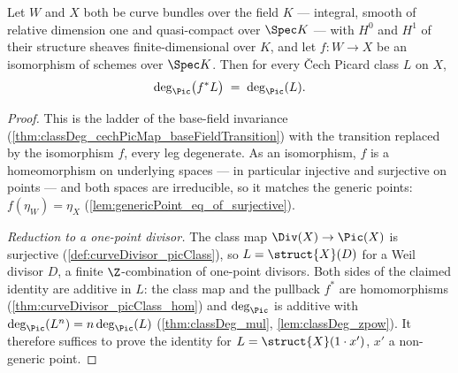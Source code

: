 \begin{theorem}
  \label{thm:classDeg_cechPicMap_of_isIso}
  \leanok
  Let \(W\) and \(X\) both be curve bundles over the field \(K\) --- integral, smooth
  of relative dimension one and quasi-compact over \(\Spec K\) --- with \(H^0\) and
  \(H^1\) of their structure sheaves finite-dimensional over \(K\), and let
  \(f : W \to X\) be an isomorphism of schemes over \(\Spec K\). Then for every \v Cech
  Picard class \(L\) on \(X\),
  \[
    \deg_{\Pic}\bigl(f^{*}L\bigr) \;=\; \deg_{\Pic}(L).
  \]
\end{theorem}
\begin{proof}
  \leanok
  This is the ladder of the base-field invariance
  (\ref{thm:classDeg_cechPicMap_baseFieldTransition}) with the transition replaced by
  the isomorphism \(f\), every leg degenerate. As an isomorphism, \(f\) is a
  homeomorphism on underlying spaces --- in particular injective and surjective on
  points --- and both spaces are irreducible, so it matches the generic points:
  \(f(\eta_W) = \eta_X\) (\ref{lem:genericPoint_eq_of_surjective}).

  \emph{Reduction to a one-point divisor.} The class map
  \(\Div(X) \to \Pic(X)\) is surjective (\ref{def:curveDivisor_picClass}), so
  \(L = \struct{X}(D)\) for a Weil divisor \(D\), a finite \(\Z\)-combination of
  one-point divisors. Both sides of the claimed identity are additive in \(L\): the
  class map and the pullback \(f^{*}\) are homomorphisms
  (\ref{thm:curveDivisor_picClass_hom}) and \(\deg_{\Pic}\) is additive with
  \(\deg_{\Pic}(L^n) = n \deg_{\Pic}(L)\) (\ref{thm:classDeg_mul},
  \ref{lem:classDeg_zpow}). It therefore suffices to prove the identity for
  \(L = \struct{X}(1 \cdot x')\), \(x'\) a non-generic point.


\end{proof}
